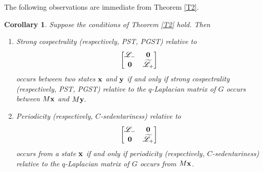 \documentclass[12pt,a4paper]{article}
\newtheorem{cor}{Corollary}
\def \x {{\bf x}}
\def \y {{\bf y}}
\def \o {{\bf 0}}
\begin{document}
The following observations are immediate from Theorem \ref{T2}.
\begin{cor}\label{C1}
Suppose the conditions of Theorem \ref{T2} hold. Then
\begin{enumerate}
\item Strong cospectrality (respectively, PST, PGST) relative to 
\[\begin{bmatrix}
    \mathscr{L}_- & \o\\ \o & \widetilde{\mathscr{L}}_+
\end{bmatrix}\]
occurs between two states $\x$ and $\y$ if and only if strong cospectrality (respectively, PST, PGST) relative to the $q$-Laplacian matrix of $G$ occurs between $M\x$ and $M\y.$
\item Periodicity (respectively, $C$-sedentariness) relative to \[\begin{bmatrix}
    \mathscr{L}_- & \o\\ \o & \widetilde{\mathscr{L}}_+
\end{bmatrix}\]
occurs from a state $\x$ if and only if periodicity (respectively, $C$-sedentariness) relative to the $q$-Laplacian matrix of $G$ occurs from $M\x$.
\end{enumerate}
\end{cor}
\end{document}
